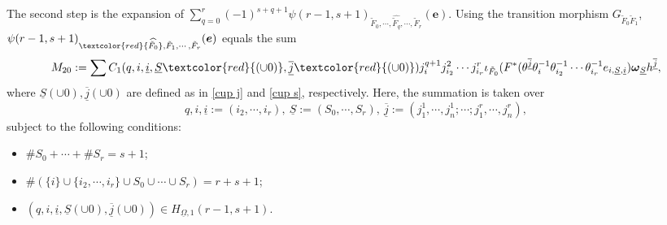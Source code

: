 \documentclass[12pt, a4paper]{article}
\begin{document}
The second step is the expansion of $\sum_{q=0}^r(-1)^{s+q+1}\psi(r-1,s+1)_{\tilde F_0,\cdots,\widehat{\tilde F_q},\cdots,\tilde F_r}(\boldsymbol{e})$.
Using the transition morphism $G_{\tilde F_0\tilde F_1}$, $\psi(r-1,s+1)_{\textcolor{red}{\widehat{\tilde F_0}},\tilde F_1,\cdots,\tilde F_r}(\boldsymbol{e})$ equals the sum
$$
 M_{20}:=\sum C_1(q,i,\underline i,\underline S\textcolor{red}{(\cup0)},\underline{\overline j}\textcolor{red}{(\cup0)})j^{q+1}_ij^2_{i_2}\cdots j^r_{i_r}\iota_{\tilde F_0}(F^*(\theta^{\underline{\overline j}}\theta_i^{-1}\theta^{-1}_{i_2}\cdots\theta^{-1}_{i_r}e_{i,\underline S,\underline i})\boldsymbol{\omega}_{\underline S}h^{\underline{\overline j}},$$
where $\underline S(\cup 0),\underline{\overline j}(\cup 0)$ are defined as in \eqref{cup j} and \eqref{cup s}, respectively. Here, the summation is taken over $$q,i,\underline i:=(i_2,\cdots,i_r),~\underline S:=(S_0,\cdots,S_r),~\underline{\overline j}:=(j^1_1,\cdots,j^1_n;\cdots;j^r_1,\cdots,j^r_n),$$ 
subject to the following conditions:
\begin{itemize}
    \item $\#S_0+\cdots+\#S_r=s+1$;
    \item $\#(\{i\}\cup\{i_2,\cdots,i_r\}\cup S_0\cup\cdots\cup S_r)=r+s+1$;
    \item $(q,i,\underline i,\underline S(\cup0),\overline{\underline j}(\cup0))\in H_{\underline\Omega,1}(r-1,s+1)$.
\end{itemize}
\end{document}
